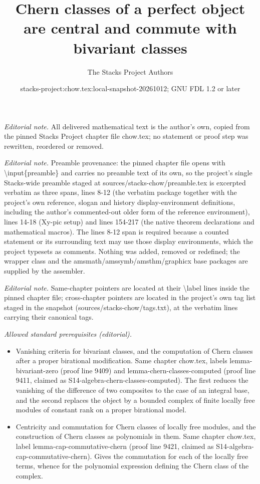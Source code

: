 \documentclass[10pt,a4paper]{amsart}
\title{Chern classes of a perfect object are central and commute with bivariant classes}
\author{The Stacks Project Authors}
\date{stacks-project:chow.tex:local-snapshot-20261012; GNU FDL 1.2 or later}
\theoremstyle{plain}
\theoremstyle{definition}
\theoremstyle{remark}
\numberwithin{equation}{subsection}
\begin{document}
\maketitle
\noindent\textit{Editorial note.} All delivered mathematical text is the author's own, copied from the pinned Stacks Project chapter file chow.tex; no statement or proof step was rewritten, reordered or removed.\par\medskip
\noindent\textit{Editorial note.} Preamble provenance: the pinned chapter file opens with \textbackslash{}input\{preamble\} and carries no preamble text of its own, so the project's single Stacks-wide preamble staged at sources/stacks-chow/preamble.tex is excerpted verbatim as three spans, lines 8-12 (the verbatim package together with the project's own reference, slogan and history display-environment definitions, including the author's commented-out older form of the reference environment), lines 14-18 (Xy-pic setup) and lines 154-217 (the native theorem declarations and mathematical macros). The lines 8-12 span is required because a counted statement or its surrounding text may use those display environments, which the project typesets as comments. Nothing was added, removed or redefined; the wrapper class and the amsmath/amssymb/amsthm/graphicx base packages are supplied by the assembler.\par\medskip
\noindent\textit{Editorial note.} Same-chapter pointers are located at their \textbackslash{}label lines inside the pinned chapter file; cross-chapter pointers are located in the project's own tag list staged in the snapshot (sources/stacks-chow/tags.txt), at the verbatim lines carrying their canonical tags.\par\medskip
\noindent\textit{Allowed standard prerequisites (editorial).}\begin{itemize}
\item Vanishing criteria for bivariant classes, and the computation of Chern classes after a proper birational modification. Same chapter chow.tex, labels lemma-bivariant-zero (proof line 9409) and lemma-chern-classes-computed (proof line 9411, claimed as S14-algebra-chern-classes-computed). The first reduces the vanishing of the difference of two composites to the case of an integral base, and the second replaces the object by a bounded complex of finite locally free modules of constant rank on a proper birational model.
\item Centricity and commutation for Chern classes of locally free modules, and the construction of Chern classes as polynomials in them. Same chapter chow.tex, label lemma-cap-commutative-chern (proof line 9421, claimed as S14-algebra-cap-commutative-chern). Gives the commutation for each of the locally free terms, whence for the polynomial expression defining the Chern class of the complex.
\end{itemize}\medskip
\end{document}
